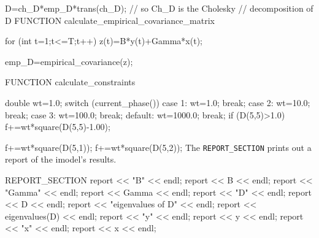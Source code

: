   D=ch_D*emp_D*trans(ch_D); // so Ch_D is the Cholesky
                      // decomposition of D
FUNCTION calculate_empirical_covariance_matrix

  for (int t=1;t<=T;t++)
    z(t)=B*y(t)+Gamma*x(t);

  emp_D=empirical_covariance(z);
  
FUNCTION  calculate_constraints

  double wt=1.0;
  switch (current_phase())
  {
  case 1:
    wt=1.0;
    break;
  case 2:
    wt=10.0;
    break;
  case 3:
    wt=100.0;
    break;
  default:
    wt=1000.0;
    break;
  }
  if (D(5,5)>1.0)
    f+=wt*square(D(5,5)-1.00);

  f+=wt*square(D(5,1));
  f+=wt*square(D(5,2));
\endexample
The {\tt REPORT\_SECTION} prints out a report of the imodel's results.

\beginexample
REPORT_SECTION
  report << "B" << endl;
  report << B << endl;
  report << "Gamma" << endl;
  report << Gamma << endl;
  report << "D" << endl;
  report << D << endl;
  report << "eigenvalues of D" << endl;
  report << eigenvalues(D) << endl;
  report << "y" << endl;
  report << y << endl;
  report << "x" << endl;
  report << x << endl;
\endexample

